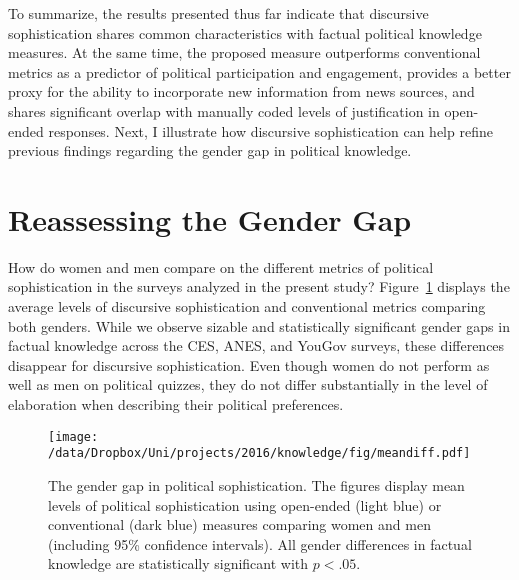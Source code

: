 To summarize, the results presented thus far indicate that discursive sophistication shares common characteristics with factual political knowledge measures. At the same time, the proposed measure outperforms conventional metrics as a predictor of political participation and engagement, provides a better proxy for the ability to incorporate new information from news sources, and shares significant overlap with manually coded levels of justification in open-ended responses. Next, I illustrate how discursive sophistication can help refine previous findings regarding the gender gap in political knowledge.

\section*{Reassessing the Gender Gap}
How do women and men compare on the different metrics of political sophistication in the surveys analyzed in the present study? Figure~\ref{fig:meandiff} displays the average levels of discursive sophistication and conventional metrics comparing both genders. While we observe sizable and statistically significant gender gaps in factual knowledge across the CES, ANES, and YouGov surveys, these differences disappear for discursive sophistication. Even though women do not perform as well as men on political quizzes, they do not differ substantially in the level of elaboration when describing their political preferences.

\begin{figure}[ht]\centering
	\texttt{[image: /data/Dropbox/Uni/projects/2016/knowledge/fig/meandiff.pdf]}
	\caption[The gender gap in political sophistication]{The gender gap in political sophistication. The figures display mean levels of political sophistication using open-ended (light blue) or conventional (dark blue) measures comparing women and men (including 95\% confidence intervals). All gender differences in factual knowledge are statistically significant with $p<.05$.}\label{fig:meandiff}
\end{figure}

\clearpage

